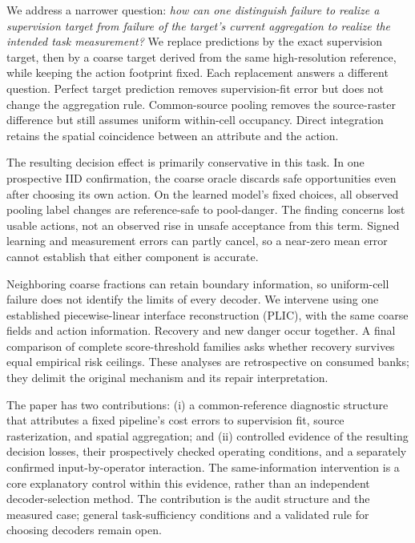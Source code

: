 \documentclass{article}
\begin{document}
We address a narrower question: \emph{how can one distinguish failure to realize
a supervision target from failure of the target's current aggregation to realize
the intended task measurement?} We replace predictions by the exact supervision
target, then by a coarse target derived from the same high-resolution reference,
while keeping the action footprint fixed. Each replacement answers a different
question. Perfect target prediction removes supervision-fit error but does not
change the aggregation rule. Common-source pooling removes the source-raster
difference but still assumes uniform within-cell occupancy. Direct integration
retains the spatial coincidence between an attribute and the action.

The resulting decision effect is primarily conservative in this task. In one
prospective IID confirmation, the coarse oracle discards safe opportunities even
after choosing its own action. On the learned model's fixed choices, all observed
pooling label changes are reference-safe to pool-danger. The finding concerns
lost usable actions, not an observed rise in unsafe acceptance from this term.
Signed learning and measurement errors can partly cancel, so a near-zero mean
error cannot establish that either component is accurate.

Neighboring coarse fractions can retain boundary information, so uniform-cell
failure does not identify the limits of every decoder. We intervene using one
established piecewise-linear interface reconstruction (PLIC), with the same
coarse fields and action information. Recovery and new danger occur together.
A final comparison of complete score-threshold families asks whether recovery
survives equal empirical risk ceilings. These analyses are retrospective on
consumed banks; they delimit the original mechanism and its repair interpretation.

The paper has two contributions: (i) a common-reference diagnostic structure
that attributes a fixed pipeline's cost errors to supervision fit, source
rasterization, and spatial aggregation; and (ii) controlled evidence of the
resulting decision losses, their prospectively checked operating conditions,
and a separately confirmed input-by-operator interaction. The same-information intervention is
a core explanatory control within this evidence, rather than an independent
decoder-selection method. The contribution is the audit structure and the
measured case; general task-sufficiency conditions and a validated rule for
choosing decoders remain open.
\end{document}
